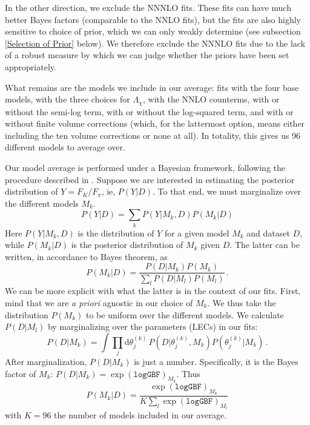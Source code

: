\documentclass[prd,tightenlines,preprintnumbers,showpacs,superscriptaddress,notitlepage,eqsecnum,floatfix,notitlepage]{revtex4-1}
\begin{document}
In the other direction, we exclude the NNNLO fits. These fits can have much better Bayes factors (comparable to the NNLO fits), but the fits are also highly sensitive to choice of prior, which we can only weakly determine (see subsection \ref{Selection of Prior} below). We therefore exclude the NNNLO fits due to the lack of a robust measure by which we can judge whether the priors have been set appropriately.

What remains are the models we include in our average: fits with the four base models, with the three choices for $\Lambda_\chi$, with the NNLO counterms, with or without the semi-log term, with or without the log-squared term, and with or without finite volume corrections (which, for the lattermost option, means either including the ten volume corrections or none at all). In totality, this gives us 96 different models to average over.

Our model average is performed under a Bayesian framework, following the procedure described in \cite{Chang_2018}. Suppose we are interested in estimating the posterior distribution of $Y = F_K / F_\pi$, ie, $P(Y|D)$. To that end, we must marginalize over the different models $M_k$. 
\begin{equation}
P(Y|D) = \sum_k P(Y | M_k, D) P(M_k | D)
\end{equation}
Here $P(Y | M_k, D)$ is the distribution of $Y$ for a given model $M_k$ and dataset $D$, while $P(M_k | D)$ is the posterior distribution of $M_k$ given $D$. The latter can be written, in accordance to Bayes theorem, as 
\begin{equation}
P(M_k | D) = \frac{P(D | M_k) P(M_k)}{\sum_l P(D | M_l) P(M_l)} \, .
\end{equation}
We can be more explicit with what the latter is in the context of our fits. First, mind that we are \emph{a priori} agnostic in our choice of $M_k$. We thus take the distribution $P(M_k)$ to be uniform over the different models. We calculate $P(D | M_l)$ by marginalizing over the parameters (LECs) in our fits:
\begin{equation}
P(D | M_k) = \int \prod_j \text{d} \theta_j^{(k)} \,  P(D | \theta_j^{(k)}, M_k) P(\theta_j^{(k)} | M_k) \, .
\end{equation}
After marginalization, $P(D | M_k)$ is just a number. Specifically, it is the Bayes factor of $M_k$: $P(D | M_k) = \exp(\texttt{logGBF})_{M_k}$. Thus
\begin{equation}
P(M_k | D) = \frac{\exp(\texttt{logGBF})_{M_k}}{K \sum_l \exp(\texttt{logGBF})_{M_l}}
\end{equation}
with $K = 96$ the number of models included in our average.
\end{document}
